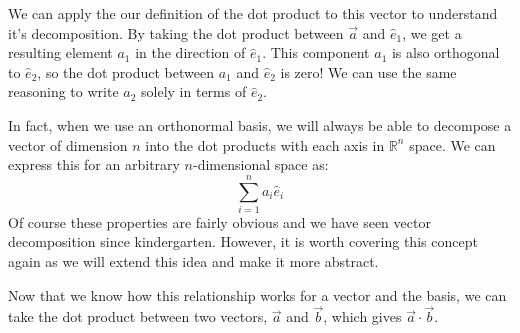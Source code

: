 We can apply the our definition of the dot product to this vector to understand it's decomposition. By taking the dot product between $\vec{a}$  and $\hat{e}_1$, we get a resulting element $a_1$ in the direction of $\hat{e}_1$. This component $a_1$ is also orthogonal to $\hat{e}_2$,  so the dot product between $a_1$ and $\hat{e}_2$ is zero! We can use the same reasoning to write $a_2$ solely in terms of $\hat{e}_2$.

In fact, when we use an orthonormal basis, we will always be able to decompose a vector of dimension $n$ into the dot products with each axis in $\mathbb{R}^n$ space. We can express this for an arbitrary $n$-dimensional space as:
$$\sum_{i=1}^n{a_i\hat{e}_i}$$
Of course these properties are fairly obvious and we have seen vector decomposition since kindergarten. However, it is worth covering this concept again as we will extend this idea and make it more abstract.

Now that we know how this relationship works for a vector and the basis, we can take the dot product between two vectors, $\vec{a}$ and $\vec{b}$, which gives $\vec{a}\cdot\vec{b}$.

